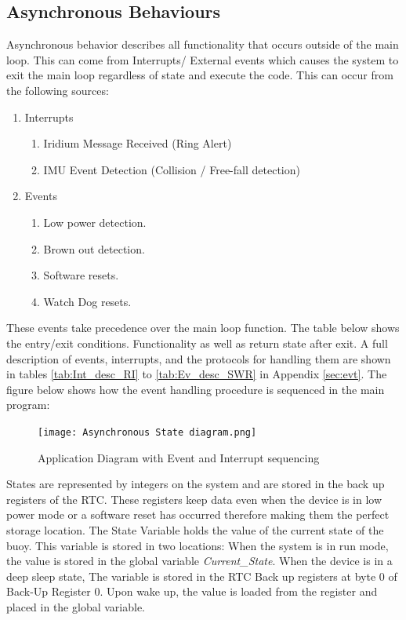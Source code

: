 \subsection{Asynchronous Behaviours}
Asynchronous behavior describes all functionality that occurs outside of the main loop. This can come from Interrupts/ External events which causes the system to exit the main loop regardless of state and execute the code. This can occur from the following sources:

\begin{enumerate}
	\item Interrupts
	\begin{enumerate}
		\item Iridium Message Received (Ring Alert)
		\item IMU Event Detection (Collision / Free-fall detection)
	\end{enumerate}
	\item Events
	\begin{enumerate}
		\item Low power detection.
		\item Brown out detection.
		\item Software resets.
		\item Watch Dog resets.
	\end{enumerate}
\end{enumerate}

These events take precedence over the main loop function. The table below shows the entry/exit conditions. Functionality as well as return state after exit. A full description of events, interrupts, and the protocols for handling them are shown in tables \ref{tab:Int_desc_RI} to \ref{tab:Ev_desc_SWR} in Appendix \ref{sec:evt}. The figure below shows how the event handling procedure is sequenced in the main program:

\begin{figure}[H]
	\centering
	\texttt{[image: Asynchronous State diagram.png]}
	\caption{Application Diagram with Event and Interrupt sequencing}
	\label{fig:main software}
\end{figure}

States are represented by integers on the system and are stored in the back up registers of the RTC. These registers keep data even when the device is in low power mode or a software reset has occurred therefore making them the perfect storage location. The State Variable holds the value of the current state of the buoy. This variable is stored in two locations: When the system is in run mode, the value is stored in the global variable \textit{Current\_State}. When the device is in a deep sleep state, The variable is stored in the RTC Back up registers at byte 0 of Back-Up Register 0. Upon wake up, the value is loaded from the register and placed in the global variable.

